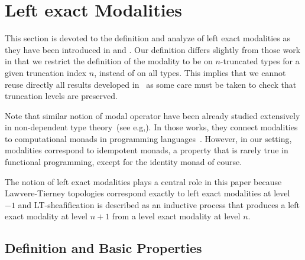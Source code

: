 \documentclass[preprint,9pt,numbers]{sigplanconf}
\newcommand{\eg}{e.g,\xspace}
\begin{document}



\section{Left exact Modalities}
\label{sec:lexmod}

This section is devoted to the definition and analyze of left exact
modalities as they have been introduced in \cite{hottbook} and
\cite{shulman-higher-modalities}. Our definition differs slightly from
those work in that we restrict the definition of the modality to be on
$n$-truncated types for a given truncation index $n$, instead of on
all types.
%
This implies that we cannot reuse directly all results developed
in~\cite{hottbook} as some care must be taken to check that truncation
levels are preserved.

Note that similar notion of modal operator have been already studied
extensively in non-dependent type
theory~(see \eg \cite{benton1998computational}). In those works, they connect
modalities to computational monads in programming
languages~\cite{moggi-monad}. However, in our setting, modalities
correspond to idempotent monads, a property that is rarely true 
in functional programming, except for the identity monad of course.

The notion of left exact modalities plays a central role in this paper
because Lawvere-Tierney topologies correspond exactly to left exact
modalities at level $-1$ and LT-sheafification is described as an inductive
process that produces a left exact modality at level $n+1$ from a
level exact modality at level $n$. 


\subsection{Definition and Basic Properties}
\label{sec:definition}
\end{document}

